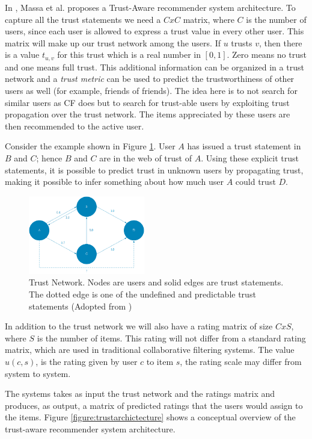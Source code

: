 In \cite{Massa2004}, Massa et al. proposes a Trust-Aware recommender system
architecture.  To capture all the trust statements we need a $CxC$ matrix,
where $C$ is the number of users, since each user is allowed to express a trust
value in every other user. This matrix will make up our trust network among the
users. If $u$ trusts $v$, then there is a value $t_{u,v}$ for this trust which
is a real number in $[0,1]$. Zero means no trust and one means full trust. This
additional information can be organized in a trust network and a \emph{trust
metric} can be used to predict the trustworthiness of other users as well (for
example, friends of friends). The idea here is to not search for similar users
as CF does but to search for trust-able users by exploiting trust propagation
over the trust network. The items appreciated by these users are then
recommended to the active user.

Consider the example shown in Figure \ref{figure:weboftrust}. User $A$ has
issued a trust statement in $B$ and $C$; hence $B$ and $C$ are in the web of
trust of $A$. Using these explicit trust statements, it is possible to predict
trust in unknown users by propagating trust, making it possible to infer
something about how much user $A$ could trust $D$.

\begin{figure}[H]
    \includegraphics[width=2in]{image/webofTrust.png}
    \centering
    \caption[Trust Network]{Trust Network. Nodes are users and solid edges are trust statements. The dotted edge is one of the undefined and predictable trust statements (Adopted from \cite{Massa2004})}
    \label{figure:weboftrust}
\end{figure}

In addition to the trust network we will also have a rating matrix of size
$CxS$, where $S$ is the number of items. This rating will not differ from a
standard rating matrix, which are used in traditional collaborative filtering
systems. The value $u(c,s)$, is the rating given by user $c$ to item $s$, the
rating scale may differ from system to system.

The systems takes as input the trust network and the ratings matrix and
produces, as output, a matrix of predicted ratings that the users would assign
to the items. Figure \ref{figure:trustarchictecture} shows a conceptual
overview of the trust-aware recommender system architecture.


